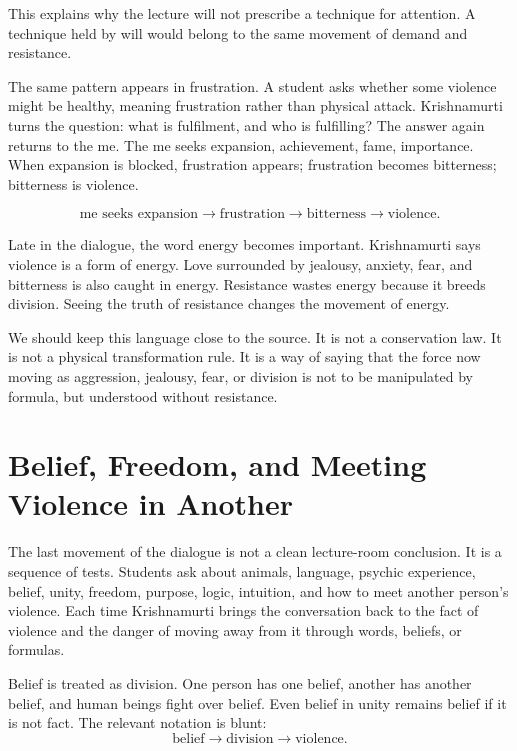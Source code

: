 This explains why the lecture will not prescribe a technique for attention. A technique held by will would belong to the same movement of demand and resistance.

The same pattern appears in frustration. A student asks whether some violence might be healthy, meaning frustration rather than physical attack. Krishnamurti turns the question: what is fulfilment, and who is fulfilling? The answer again returns to the me. The me seeks expansion, achievement, fame, importance. When expansion is blocked, frustration appears; frustration becomes bitterness; bitterness is violence.

\begin{equation}
\text{me seeks expansion}
\rightarrow
\text{frustration}
\rightarrow
\text{bitterness}
\rightarrow
\text{violence}.
\end{equation}

Late in the dialogue, the word energy becomes important. Krishnamurti says violence is a form of energy. Love surrounded by jealousy, anxiety, fear, and bitterness is also caught in energy. Resistance wastes energy because it breeds division. Seeing the truth of resistance changes the movement of energy.

We should keep this language close to the source. It is not a conservation law. It is not a physical transformation rule. It is a way of saying that the force now moving as aggression, jealousy, fear, or division is not to be manipulated by formula, but understood without resistance.

\section{Belief, Freedom, and Meeting Violence in Another}

The last movement of the dialogue is not a clean lecture-room conclusion. It is a sequence of tests. Students ask about animals, language, psychic experience, belief, unity, freedom, purpose, logic, intuition, and how to meet another person's violence. Each time Krishnamurti brings the conversation back to the fact of violence and the danger of moving away from it through words, beliefs, or formulas.

Belief is treated as division. One person has one belief, another has another belief, and human beings fight over belief. Even belief in unity remains belief if it is not fact. The relevant notation is blunt:
\begin{equation}
\text{belief}
\rightarrow
\text{division}
\rightarrow
\text{violence}.
\end{equation}

